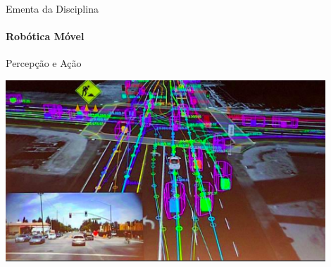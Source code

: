 \documentclass{beamer}
\begin{document}
\begin{frame}[t]{Ementa da Disciplina}
	\framesubtitle{Robótica Móvel}
	\begin{block}{Percepção e Ação}
	\end{block}
	\begin{center}
		\includegraphics[width=0.9\textwidth]{./images/autonomous-car_2.png}
	\end{center}
\end{frame}
\end{document}
